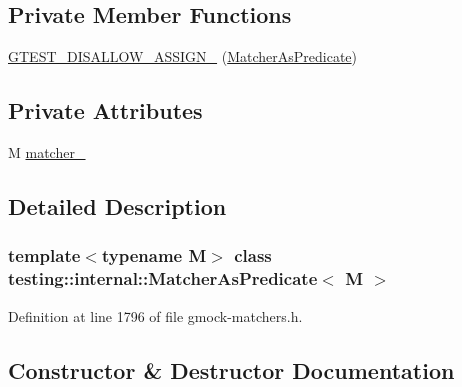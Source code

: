 \subsection*{Private Member Functions}
\begin{DoxyCompactItemize}
\item 
\hyperlink{classtesting_1_1internal_1_1MatcherAsPredicate_a0495e5defae09e1205ee053b4ca788cf}{G\+T\+E\+S\+T\+\_\+\+D\+I\+S\+A\+L\+L\+O\+W\+\_\+\+A\+S\+S\+I\+G\+N\+\_\+} (\hyperlink{classtesting_1_1internal_1_1MatcherAsPredicate}{Matcher\+As\+Predicate})
\end{DoxyCompactItemize}
\subsection*{Private Attributes}
\begin{DoxyCompactItemize}
\item 
M \hyperlink{classtesting_1_1internal_1_1MatcherAsPredicate_a29dddc97262852645d39e11c4bb34b58}{matcher\+\_\+}
\end{DoxyCompactItemize}


\subsection{Detailed Description}
\subsubsection*{template$<$typename M$>$\newline
class testing\+::internal\+::\+Matcher\+As\+Predicate$<$ M $>$}



Definition at line 1796 of file gmock-\/matchers.\+h.



\subsection{Constructor \& Destructor Documentation}
\mbox{\label{classtesting_1_1internal_1_1MatcherAsPredicate_a2d8ad258929496dd3dea00fdb8ce3c8a}} 
